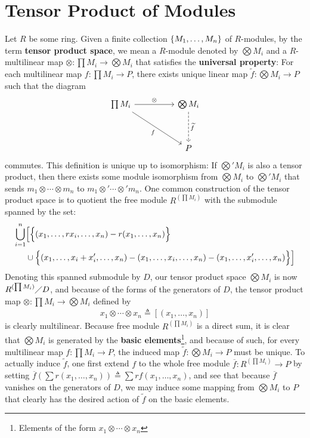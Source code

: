 \documentclass{report}
\begin{document}
\section{Tensor Product of Modules}
Let $R$ be some ring. Given a finite collection $\{ M_1,\dots ,M_n \}$ of $R$-modules, by the term \textbf{tensor product space}, we mean a $R$-module denoted by $\bigotimes M_i$ and a $R$-multilinear map $\otimes : \prod M_i \rightarrow \bigotimes M_i$ that satisfies the \textbf{universal property}: For each multilinear map $f:\prod M_i \rightarrow P$, there exists unique linear map $\tilde{f}:\bigotimes M_i \rightarrow P$ such that the diagram 
\[\begin{tikzcd}
	{\prod M_i} && {\bigotimes   M_i} \\
	\\
	&& P 
	\arrow["\otimes ", from=1-1, to=1-3]
	\arrow["f"', from=1-1, to=3-3]
	\arrow["\tilde{f} ", dashed, from=1-3, to=3-3]
\end{tikzcd}\]
commutes. This definition is unique up to isomorphism: If $\bigotimes 'M_i$ is also a tensor product, then there exists some module isomorphism from $\bigotimes  M_i$ to $\bigotimes  'M_i$ that sends $m_1 \otimes  \cdots \otimes  m_n$ to $m_1 \otimes  ' \cdots \otimes  ' m_n$. One common construction of the tensor product space is to quotient the free module $R^{(\prod M_i)}$ with the submodule spanned by the set:
\begin{align*}
  \bigcup_{i=1}^n &\Big[\Big\{ (x_1,\dots, rx_i ,\dots, x_n)-r(x_1,\dots ,x_n) \Big\}\\
 & \cup \Big\{ (x_1,\dots ,x_i +x_i',\dots  ,x_n)- (x_1,\dots ,x_i,\dots  ,x_n)-(x_1,\dots ,x_i',\dots ,x_n) \Big\}  \Big]
\end{align*}
Denoting this spanned submodule by $D$, our tensor product space $\bigotimes M_i$ is now $R^{(\prod M_i)}\diagup D$, and because of the forms of the generators of $D$, the tensor product map $\otimes  :\prod M_i \rightarrow \bigotimes  M_i$ defined by 
\begin{align*}
x_1\otimes  \cdots \otimes  x_n \triangleq [(x_1,\dots ,x_n)] 
\end{align*}
is clearly multilinear. Because free module $R^{(\prod M_i)}$ is a direct sum, it is clear that $\bigotimes M_i$ is generated by the \textbf{basic elements}\footnote{Elements of the form $x_1\otimes  \cdots \otimes  x_n$}, and because of such, for every multilinear map $f:\prod M_i \rightarrow P$, the induced map $\tilde{f}: \bigotimes M_i \rightarrow P$ must be unique. To actually induce $\tilde{f}$, one first extend $f$ to the whole free module $\overline{f}:R^{(\prod M_i)}\rightarrow P$ by setting $\overline{f}(\sum r (x_1,\dots ,x_n))\triangleq \sum rf(x_1,\dots ,x_n)$, and see that because $\overline{f}$ vanishes on the generators of $D$, we may induce some mapping from $\bigotimes M_i$ to $P$ that clearly has the desired action of $\tilde{f}$ on the basic elements. \\
\end{document}
